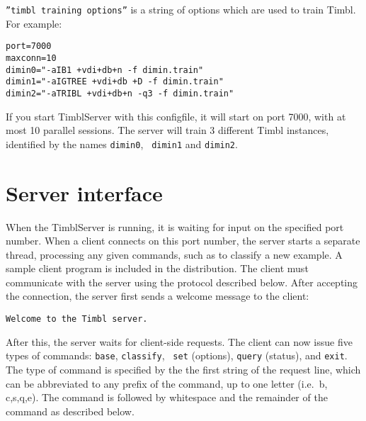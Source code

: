 \documentclass{report}
\begin{document}
{\tt ''timbl training options''} is a string of options which are used
to train Timbl. For example:

\begin{verbatim}
port=7000
maxconn=10
dimin0="-aIB1 +vdi+db+n -f dimin.train"
dimin1="-aIGTREE +vdi+db +D -f dimin.train"
dimin2="-aTRIBL +vdi+db+n -q3 -f dimin.train"
\end{verbatim}

If you start TimblServer with this configfile, it will start on port
7000, with at most 10 parallel sessions. The server will train 3
different Timbl instances, identified by the names {\tt dimin0}, {\tt
  dimin1} and {\tt dimin2}.

\section{Server interface}
\label{serverformat}

When the TimblServer is running, it is waiting for input on the
specified port number. When a client connects on this port number, the
server starts a separate thread, processing any given commands, such
as to classify a new example. A sample client program is included in
the distribution. The client must communicate with the server using
the protocol described below. After accepting the connection, the
server first sends a welcome message to the client:

{\tt Welcome to the Timbl server.}

After this, the server waits for client-side requests.  The client can
now issue five types of commands: {\tt base}, {\tt classify}, {\tt
  set} (options), {\tt query} (status), and {\tt exit}. The type of
command is specified by the the first string of the request line,
which can be abbreviated to any prefix of the command, up to one
letter (i.e.~b, c,s,q,e). The command is followed by whitespace and
the remainder of the command as described below.
\end{document}
